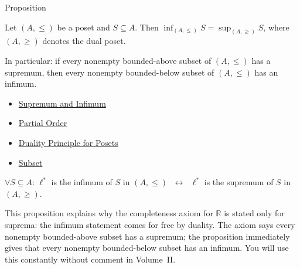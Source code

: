 
\begin{propositionbox}{Proposition}
\begin{proposition}
\label{prop:sup-inf-duality}
Let $(A, \leq)$ be a poset and $S \subseteq A$.  Then
$\inf_{(A,\leq)} S = \sup_{(A,\geq)} S$,
where $(A,\geq)$ denotes the dual poset.

In particular: if every nonempty bounded-above subset of $(A,\leq)$ has a
supremum, then every nonempty bounded-below subset of $(A,\leq)$ has an
infimum.
\end{proposition}
\end{propositionbox}

\begin{dependencies}
\begin{itemize}
  \item \hyperref[def:sup-inf]{Supremum and Infimum}
  \item \hyperref[def:partial-order]{Partial Order}
  \item \hyperref[prop:order-duality]{Duality Principle for Posets}
  \item \hyperref[def:subset]{Subset}
\end{itemize}
\end{dependencies}

\begin{remark*}
$\forall S \subseteq A$: $\ell^*$ is the infimum of $S$ in $(A,\leq)$
$\;\leftrightarrow\;$ $\ell^*$ is the supremum of $S$ in $(A,\geq)$.
\end{remark*}

\begin{remark*}
\label{rem:inf-from-completeness}
This proposition explains why the completeness axiom for $\mathbb{R}$ is
stated only for suprema: the infimum statement comes for free by duality.
The axiom says every nonempty bounded-above subset has a supremum; the
proposition immediately gives that every nonempty bounded-below subset has
an infimum.  You will use this constantly without comment in Volume~II.
\end{remark*}


